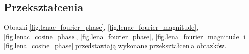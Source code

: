 \documentclass{classrep}
\begin{document}
\subsection{Przekształcenia}
Obrazki \ref{fig.lenac_fourier_phase}, \ref{fig.lenac_fourier_magnitude}, \ref{fig.lenac_cosine_phase}, \ref{fig.lena_fourier_phase}, \ref{fig.lena_fourier_magnitude} i \ref{fig.lena_cosine_phase} przedstawiają wykonane przekształcenia obrazków.

\begin{figure}
\end{figure}
\end{document}
